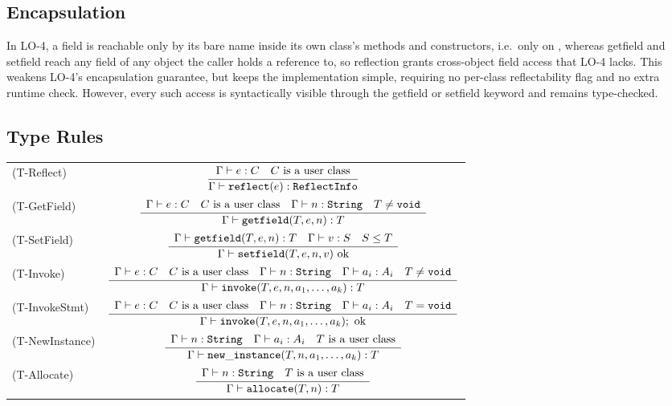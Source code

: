 \subsection*{Encapsulation}
In LO-4, a field is reachable only by its bare name
inside its own class's methods and constructors, i.e.\ only on
, whereas getfield and setfield reach any field of any object the caller
holds a reference to, so reflection grants cross-object field access that
LO-4 lacks. This weakens LO-4's encapsulation guarantee, but keeps the
implementation simple, requiring no per-class reflectability flag and no extra
runtime check. However, every such access is syntactically
visible through the getfield or setfield keyword and remains type-checked.

\subsection*{Type Rules}
\begin{center}
\renewcommand{\arraystretch}{2.6}
\begin{tabular}{@{}l c@{}}
\toprule
(T-Reflect) &
  $\dfrac{\begin{array}{c}\Gamma \vdash e : C \quad C \text{ is a user class}\end{array}}{\Gamma \vdash \mathtt{reflect}(e) : \mathtt{ReflectInfo}}$ \\
(T-GetField) &
  $\dfrac{\begin{array}{c}\Gamma \vdash e : C \quad C \text{ is a user class} \quad \Gamma \vdash n : \mathtt{String} \quad T \neq \mathtt{void}\end{array}}{\Gamma \vdash \mathtt{getfield}(T, e, n) : T}$ \\
(T-SetField) &
  $\infrule{\Gamma \vdash \tm{getfield}(T, e, n) : T \quad \Gamma \vdash v : S \quad S \le T}
           {\Gamma \vdash \tm{setfield}(T, e, n, v)\ \text{ok}}$ \\
(T-Invoke) &
  $\dfrac{\begin{array}{c}\Gamma \vdash e : C \quad C \text{ is a user class} \quad \Gamma \vdash n : \mathtt{String} \quad \Gamma \vdash a_i : A_i \quad T \neq \mathtt{void}\end{array}}{\Gamma \vdash \mathtt{invoke}(T, e, n, a_1, \ldots, a_k) : T}$ \\
(T-InvokeStmt) &
  $\infrule{\Gamma \vdash e : C \quad C \text{ is a user class} \quad \Gamma \vdash n : \tm{String} \quad \Gamma \vdash a_i : A_i \quad T = \tm{void}}
           {\Gamma \vdash \tm{invoke}(T, e, n, a_1, \ldots, a_k);\ \text{ok}}$ \\
(T-NewInstance) &
  $\dfrac{\begin{array}{c}\Gamma \vdash n : \mathtt{String} \quad \Gamma \vdash a_i : A_i \quad T \text{ is a user class}\end{array}}{\Gamma \vdash \mathtt{new\_instance}(T, n, a_1, \ldots, a_k) : T}$ \\
(T-Allocate) &
  $\dfrac{\begin{array}{c}\Gamma \vdash n : \mathtt{String} \quad T \text{ is a user class}\end{array}}{\Gamma \vdash \mathtt{allocate}(T, n) : T}$ \\[1ex]
\bottomrule
\end{tabular}
\end{center}

